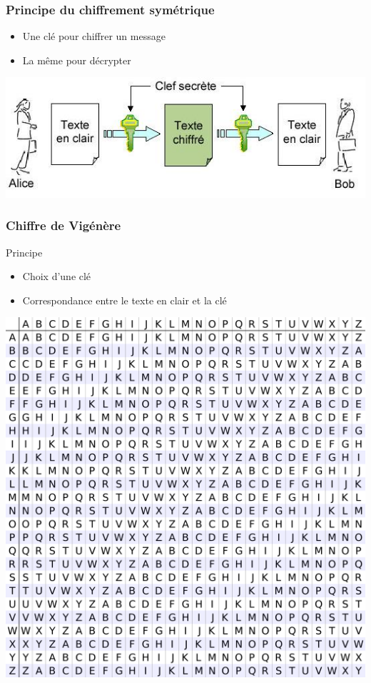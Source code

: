 \documentclass[xcolor={dvipsnames}]{beamer}
\begin{document}
\begin{frame}
\frametitle{Principe du chiffrement symétrique}

\begin{itemize}
	\item Une clé pour chiffrer un message
	\item La même pour décrypter
\end{itemize}

\begin{center}
	\includegraphics[scale=0.5]{sym}
\end{center}
\end{frame}

\begin{frame}
\frametitle{Chiffre de Vigénère}

\begin{block}{Principe}
	\begin{itemize}
		\item Choix d'une clé
		\item Correspondance entre le texte en clair et la clé
	\end{itemize}
	
	\begin{center}
		\includegraphics[scale=0.08]{vigenere}
	\end{center}
\end{block}
\end{frame}
\end{document}
